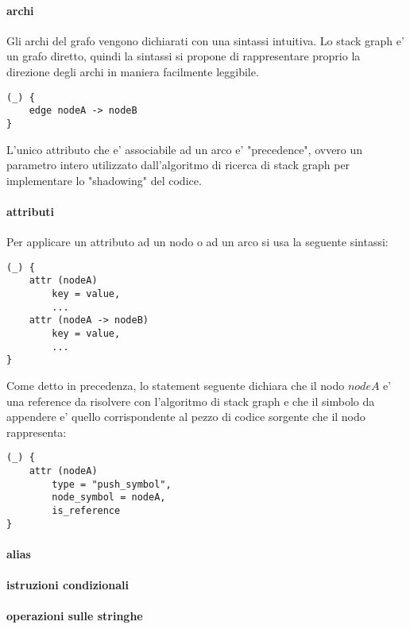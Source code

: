 \paragraph{archi}

Gli archi del grafo vengono dichiarati con una sintassi intuitiva.
Lo stack graph e' un grafo diretto, quindi la sintassi si propone di rappresentare proprio la direzione degli archi in maniera facilmente leggibile.

\begin{verbatim}
(_) {
    edge nodeA -> nodeB
}
\end{verbatim}

L'unico attributo che e' associabile ad un arco e' "precedence", ovvero un parametro intero utilizzato dall'algoritmo di ricerca di stack graph per implementare lo "shadowing" del codice.

\paragraph{attributi}

Per applicare un attributo ad un nodo o ad un arco si usa la seguente sintassi:

\begin{verbatim}
(_) {
    attr (nodeA)
        key = value,
        ...
    attr (nodeA -> nodeB)
        key = value,
        ...
}
\end{verbatim}

Come detto in precedenza, lo statement seguente dichiara che il nodo $nodeA$ e' una reference da risolvere con l'algoritmo di stack graph e che il simbolo da appendere e' quello corrispondente al pezzo di codice sorgente che il nodo rappresenta:

\begin{verbatim}
(_) {
    attr (nodeA)
        type = "push_symbol",
        node_symbol = nodeA,
        is_reference
}
\end{verbatim}

\paragraph{alias}

\paragraph{istruzioni condizionali}

\paragraph{operazioni sulle stringhe}

